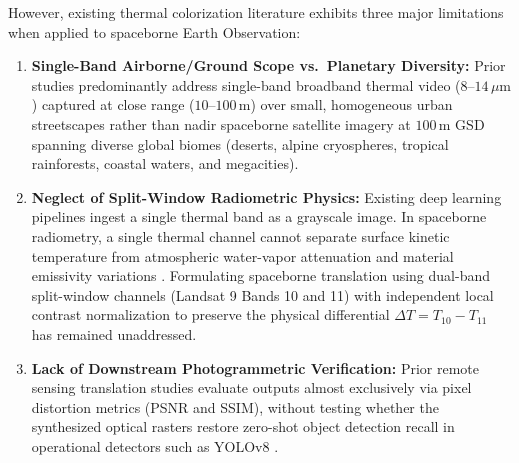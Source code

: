 \documentclass[10pt,a4paper,twoside]{article}
\begin{document}
However, existing thermal colorization literature exhibits three major limitations when applied to spaceborne Earth Observation:
\begin{enumerate}
    \item \textbf{Single-Band Airborne/Ground Scope vs.~Planetary Diversity:} Prior studies predominantly address single-band broadband thermal video ($8\text{--}14\,\mu\text{m}$) captured at close range ($10\text{--}100\,\text{m}$) over small, homogeneous urban streetscapes rather than nadir spaceborne satellite imagery at $100\,\text{m}$ GSD spanning diverse global biomes (deserts, alpine cryospheres, tropical rainforests, coastal waters, and megacities).
    \item \textbf{Neglect of Split-Window Radiometric Physics:} Existing deep learning pipelines ingest a single thermal band as a grayscale image. In spaceborne radiometry, a single thermal channel cannot separate surface kinetic temperature from atmospheric water-vapor attenuation and material emissivity variations \cite{ref3, ref5}. Formulating spaceborne translation using dual-band split-window channels (Landsat 9 Bands 10 and 11) with independent local contrast normalization to preserve the physical differential $\Delta T = T_{10} - T_{11}$ has remained unaddressed.
    \item \textbf{Lack of Downstream Photogrammetric Verification:} Prior remote sensing translation studies evaluate outputs almost exclusively via pixel distortion metrics (PSNR and SSIM), without testing whether the synthesized optical rasters restore zero-shot object detection recall in operational detectors such as YOLOv8 \cite{ref4}.
\end{enumerate}

\end{document}
